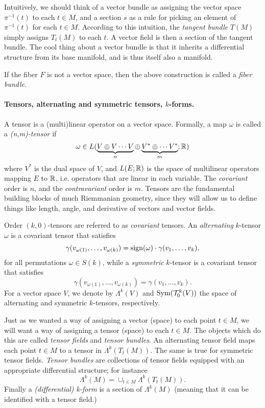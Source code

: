 \documentclass{article}
\begin{document}
	Intuitively, we should think of a vector bundle as assigning the vector space $\pi^{-1}(t)$ to each $t \in M$, and a section $s$ as a rule for picking an element of $\pi^{-1}(t)$ for each $t \in M$. According to this intuition, the \emph{tangent bundle} $T(M)$ simply assigns $T_t(M)$ to each $t$. A vector field is then a section of the tangent bundle. The cool thing about a vector bundle is that it inherits a differential structure from its base manifold, and is thus itself also a manifold. 
	
	If the fiber $F$ is not a vector space, then the above construction is called a \emph{fiber bundle}.
	
	\paragraph{Tensors, alternating and symmetric tensors, $k$-forms.}
	A tensor is a (multi)linear operator on a vector space. Formally, a map $\omega$ is called a \emph{(n,m)-tensor} if 
	$$
	\omega \in L(\underbrace{V \oplus V \cdots V}_{n} \oplus \underbrace{V^{*} \oplus \cdots V^*}_{m};\mathbb{R})
	$$ 
	where $V^*$ is the dual space of $V$, and $L(E;\mathbb{R})$ is the space of multilinear operators mapping $E$ to $\mathbb{R}$, i.e. operators that are linear in each variable. The \emph{covariant} order is $n$, and the \emph{contravariant} order is $m$. Tensors are the fundamental building blocks of much Riemmanian geometry, since they will allow us to define things like length, angle, and derivative of vectors and vector fields. 
	
	Order $(k,0)$-tensors are referred to as \emph{covariant} tensors. An \emph{alternating} $k$-tensor $\omega$ is a covariant tensor that satisfies
	\begin{equation*}
		\gamma(v_{\omega(1)},\ldots,v_{\omega(k)}) = \mathrm{sign}(\omega) \cdot \gamma(v_{1},\ldots,v_{k}),
	\end{equation*}
	for all permutations $\omega \in S(k)$, while a \emph{symmetric} $k$-tensor is a covariant tensor that satisfies
	\begin{equation*}
		\gamma(v_{\omega(1)},\ldots,v_{\omega(k)}) = \gamma(v_{1},\ldots,v_{k}).
	\end{equation*}
	For a vector space $V$, we denote by $\Lambda^k(V)$ and ${\rm Sym}(\mathcal{T}_0^{k}(V))$ the space of alternating and symmetric $k$-tensors, respectively. 
	
	Just as we wanted a way of assigning a vector (space) to each point $t \in M$, we will want a way of assigning a tensor (space) to each $t \in M$. The objects which do this are called \emph{tensor fields} and \emph{tensor bundles}. An alternating tensor field maps each point $t \in M$ to a tensor in $\Lambda^{k}(T_t(M))$. The same is true for symmetric tensor fields. \emph{Tensor bundles} are collections of tensor fields equipped with an appropriate differential structure; for instance
	$$
	\Lambda^k(M) = \cup_{t \in M} \Lambda^k(T_t(M)).
	$$
	Finally a \emph{(differential) k-form} is a section of $\Lambda^k(M)$ (meaning that it can be identified with a tensor field.)
	
\end{document}
